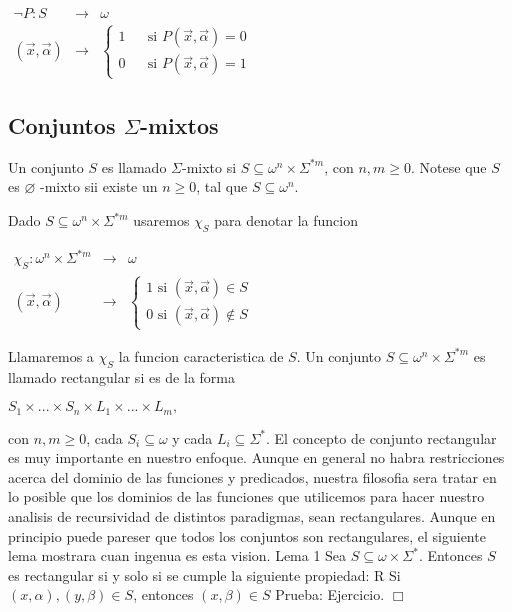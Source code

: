 \(\displaystyle \begin{array}{rll} \lnot P:S & \rightarrow & \omega \\ (\vec{x},\vec{\alpha}) & \rightarrow & \left\{ \begin{array}{lll} 1 & & \text{si }P(\vec{x},\vec{\alpha})=0 \\ 0 & & \text{si }P(\vec{x},\vec{\alpha})=1 \end{array} \right. \end{array} \)

\subsection{Conjuntos \(\Sigma \)-mixtos}

Un conjunto \(S\) es llamado \(\Sigma \)-mixto si \(S\subseteq \omega ^{n}\times \Sigma ^{\ast m}\), con \(n,m\geq 0\). Notese que \(S\) es \(\varnothing \) -mixto sii existe un \(n\geq 0\), tal que \(S\subseteq \omega ^{n}\).

Dado \(S\subseteq \omega ^{n}\times \Sigma ^{\ast m}\) usaremos \(\chi _{S}\) para denotar la funcion

\(\displaystyle \begin{array}{rcl} \chi _{S}:\omega ^{n}\times \Sigma ^{\ast m} & \rightarrow & \omega \\ (\vec{x},\vec{\alpha}) & \rightarrow & \left\{ \begin{array}{c} 1\text{ si }(\vec{x},\vec{\alpha})\in S \\ 0\text{ si }(\vec{x},\vec{\alpha})\notin S \end{array} \right. \end{array} \)

Llamaremos a \(\chi _{S}\) la funcion caracteristica de \(S\).
Un conjunto \(S\subseteq \omega ^{n}\times \Sigma ^{\ast m}\) es llamado rectangular si es de la forma

\(\displaystyle S_{1}\times ...\times S_{n}\times L_{1}\times ...\times L_{m}, \)

con \(n,m\geq 0\), cada \(S_{i}\subseteq \omega \) y cada \(L_{i}\subseteq \Sigma ^{\ast }\). El concepto de conjunto rectangular es muy importante en nuestro enfoque. Aunque en general no habra restricciones acerca del dominio de las funciones y predicados, nuestra filosofia sera tratar en lo posible que los dominios de las funciones que utilicemos para hacer nuestro analisis de recursividad de distintos paradigmas, sean rectangulares. Aunque en principio puede pareser que todos los conjuntos son rectangulares, el siguiente lema mostrara cuan ingenua es esta vision.
Lema 1 Sea \(S\subseteq \omega \times \Sigma ^{\ast }\). Entonces \(S\) es rectangular si y solo si se cumple la siguiente propiedad:
R Si \((x,\alpha ),(y,\beta )\in S\), entonces \((x,\beta )\in S\)
Prueba: Ejercicio. \(\Box\)

